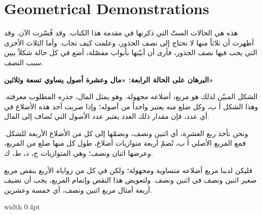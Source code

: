 \documentclass[11pt,a4paper]{book}
\begin{document}
\chapter{Geometrical Demonstrations}
\label{ch:geom}

\noindent\begin{minipage}[t]{0.48\textwidth}
\raggedleft

\begin{Arabic}
هذه هي الحالات الستّ التي ذكرتها في مقدمة هذا الكتاب. وقد فُسّرت الآن. وقد أظهرت أن ثلاثاً منها لا تحتاج إلى نصف الجذور، وعلمت كيف تجاب. وأما الثلاث الأخرى التي يجب فيها نصف الجذور، فأرى أن أبيّنها بأبواب مفصّلة، أضع في كل حالة شكلاً يبين سبب النصف.

\textbf{البرهان على الحالة الرابعة: «مال وعشرة أصول يساوي تسعة وثلاثين»}

الشكل المبيّن لذلك هو مربع، أضلاعه مجهولة. وهو يمثل المال، جذره المطلوب معرفته. وهذا الشكل أ ب، وكل ضلع منه يعتبر واحداً من أصوله؛ وإذا ضربت أحد هذه الأضلاع في أي عدد، فإن مقدار ذلك العدد يعتبر عدد الأصول التي تُضاف إلى المال.

ونحن نأخذ ربع العشرة، أي اثنين ونصف، ونضمّها إلى كل من الأضلاع الأربعة للشكل. فمع المربع الأصلي أ ب، تُضمّ أربعة متوازيات أضلاع، طول كل منها ضلع من المربع، وعرضها اثنان ونصف؛ وهي المتوازيات ج، د، ط، ك.

فليكن لدينا مربع أضلاعه متساوية ومجهولة؛ ولكن في كل من زواياه الأربع ينقص مربع صغير اثنين ونصف في اثنين ونصف. ولتعويض هذا النقص وإتمام المربع، يجب أن نضيف أربعة أمثال مربع اثنين ونصف، أي خمسة وعشرين.
\end{Arabic}

\end{minipage}%
\hfill\vrule width 0.4pt\hfill
\end{document}
